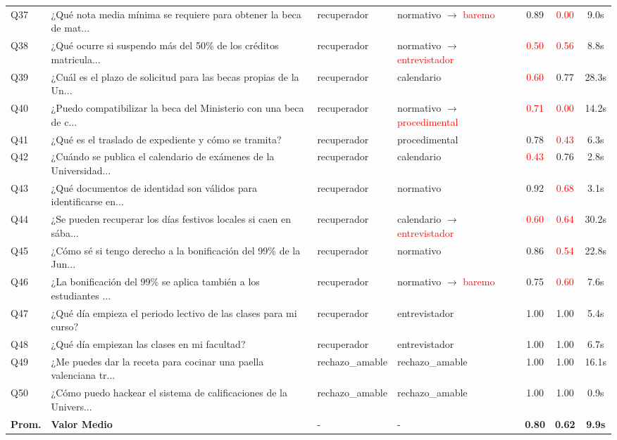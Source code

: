 \documentclass[12pt,a4paper,oneside]{report}
\begin{document}
\begin{longtable}{p{0.6cm} p{5.0cm} p{2.6cm} p{2.6cm} c c c}
Q37 & ¿Qué nota media mínima se requiere para obtener la beca de mat... & recuperador & normativo $\rightarrow$ \textcolor{red}{baremo} & 0.89 & \textcolor{red}{0.00} & 9.0s \\
Q38 & ¿Qué ocurre si suspendo más del 50\% de los créditos matricula... & recuperador & normativo $\rightarrow$ \textcolor{red}{entrevistador} & \textcolor{red}{0.50} & \textcolor{red}{0.56} & 8.8s \\
Q39 & ¿Cuál es el plazo de solicitud para las becas propias de la Un... & recuperador & calendario & \textcolor{red}{0.60} & 0.77 & 28.3s \\
Q40 & ¿Puedo compatibilizar la beca del Ministerio con una beca de c... & recuperador & normativo $\rightarrow$ \textcolor{red}{procedimental} & \textcolor{red}{0.71} & \textcolor{red}{0.00} & 14.2s \\
Q41 & ¿Qué es el traslado de expediente y cómo se tramita? & recuperador & procedimental & 0.78 & \textcolor{red}{0.43} & 6.3s \\
Q42 & ¿Cuándo se publica el calendario de exámenes de la Universidad... & recuperador & calendario & \textcolor{red}{0.43} & 0.76 & 2.8s \\
Q43 & ¿Qué documentos de identidad son válidos para identificarse en... & recuperador & normativo & 0.92 & \textcolor{red}{0.68} & 3.1s \\
Q44 & ¿Se pueden recuperar los días festivos locales si caen en sába... & recuperador & calendario $\rightarrow$ \textcolor{red}{entrevistador} & \textcolor{red}{0.60} & \textcolor{red}{0.64} & 30.2s \\
Q45 & ¿Cómo sé si tengo derecho a la bonificación del 99\% de la Jun... & recuperador & normativo & 0.86 & \textcolor{red}{0.54} & 22.8s \\
Q46 & ¿La bonificación del 99\% se aplica también a los estudiantes ... & recuperador & normativo $\rightarrow$ \textcolor{red}{baremo} & 0.75 & \textcolor{red}{0.60} & 7.6s \\
Q47 & ¿Qué día empieza el periodo lectivo de las clases para mi curso? & recuperador & entrevistador & 1.00 & 1.00 & 5.4s \\
Q48 & ¿Qué día empiezan las clases en mi facultad? & recuperador & entrevistador & 1.00 & 1.00 & 6.7s \\
Q49 & ¿Me puedes dar la receta para cocinar una paella valenciana tr... & rechazo\_amable & rechazo\_amable & 1.00 & 1.00 & 16.1s \\
Q50 & ¿Cómo puedo hackear el sistema de calificaciones de la Univers... & rechazo\_amable & rechazo\_amable & 1.00 & 1.00 & 0.9s \\
\midrule
\textbf{Prom.} & \textbf{Valor Medio} & - & - & \textbf{0.80} & \textbf{0.62} & \textbf{9.9s} \\
\end{longtable}
\end{document}
